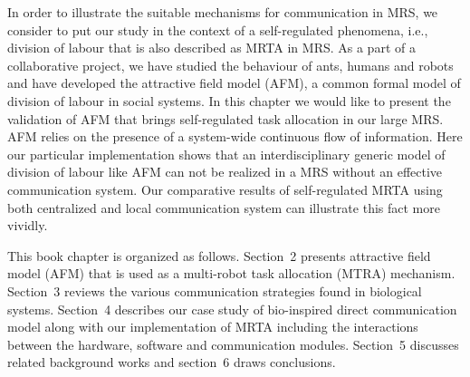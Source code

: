 \documentclass[10pt,a4paper]{article}
\begin{document}
\begin{enumerate}
In order to illustrate the suitable mechanisms for communication in MRS, we consider to put our study in the context of a self-regulated phenomena, i.e., division of labour that is also described as MRTA in MRS. As a part of a collaborative project, we have studied the behaviour of ants, humans and robots and have developed the attractive field model (AFM), a common formal model of division of labour in social systems. In this chapter we would like to present the validation of AFM that brings self-regulated task allocation in our large MRS. AFM relies on the presence of a system-wide continuous flow of information. Here our particular implementation shows that an interdisciplinary generic model of division of labour like AFM can not be realized in a MRS without an effective communication system. Our comparative results of self-regulated MRTA using both centralized and local communication system can illustrate this fact more vividly.

This book chapter is organized as follows. Section~2 presents attractive field model (AFM) that is used as a multi-robot task allocation (MTRA) mechanism. Section~3 reviews the various communication strategies found in biological systems. Section~4 describes our case study of bio-inspired direct communication model along with our implementation of MRTA including the interactions between the hardware, software and communication modules.  Section~5 discusses related background works and section~6 draws conclusions.
\end{enumerate}
\end{document}
